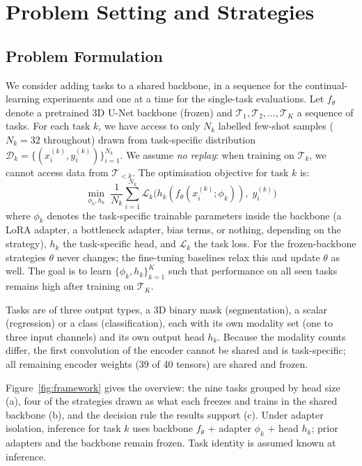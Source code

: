 \iffull\documentclass[journal]{IEEEtran}\else\documentclass[journal,twoside,web]{ieeecolor}\usepackage{generic}\fi
\begin{document}
\section{Problem Setting and Strategies}
\label{sec:method}

\subsection{Problem Formulation}
\label{sec:problem}

We consider adding tasks to a shared backbone, in a sequence for the continual-learning experiments and one at a time for the single-task evaluations. Let $f_\theta$ denote a pretrained 3D U-Net backbone (frozen) and $\mathcal{T}_1, \mathcal{T}_2, \ldots, \mathcal{T}_K$ a sequence of tasks. For each task $k$, we have access to only $N_k$ labelled few-shot samples ($N_k = 32$ throughout) drawn from task-specific distribution $\mathcal{D}_k = \{(x_i^{(k)}, y_i^{(k)})\}_{i=1}^{N_k}$. We assume \emph{no replay}: when training on $\mathcal{T}_k$, we cannot access data from $\mathcal{T}_{<k}$. The optimisation objective for task $k$ is:
\begin{equation}
\min_{\phi_k, h_k} \; \frac{1}{N_k} \sum_{i=1}^{N_k} \mathcal{L}_k \bigl( h_k(f_\theta(x_i^{(k)}; \phi_k)),\; y_i^{(k)} \bigr)
\label{eq:objective}
\end{equation}
where $\phi_k$ denotes the task-specific trainable parameters inside the backbone (a LoRA adapter, a bottleneck adapter, bias terms, or nothing, depending on the strategy), $h_k$ the task-specific head, and $\mathcal{L}_k$ the task loss. For the frozen-backbone strategies $\theta$ never changes; the fine-tuning baselines relax this and update $\theta$ as well. The goal is to learn $\{\phi_k, h_k\}_{k=1}^K$ such that performance on all seen tasks remains high after training on $\mathcal{T}_K$.

Tasks are of three output types, a 3D binary mask (segmentation), a scalar (regression) or a class (classification), each with its own modality set (one to three input channels) and its own output head $h_k$. Because the modality counts differ, the first convolution of the encoder cannot be shared and is task-specific; all remaining encoder weights (39 of 40 tensors) are shared and frozen.

Figure~\ref{fig:framework} gives the overview: the nine tasks grouped by head size (a), four of the strategies drawn as what each freezes and trains in the shared backbone (b), and the decision rule the results support (c). Under adapter isolation, inference for task $k$ uses backbone $f_\theta$ + adapter $\phi_k$ + head $h_k$; prior adapters and the backbone remain frozen. Task identity is assumed known at inference.
\end{document}
